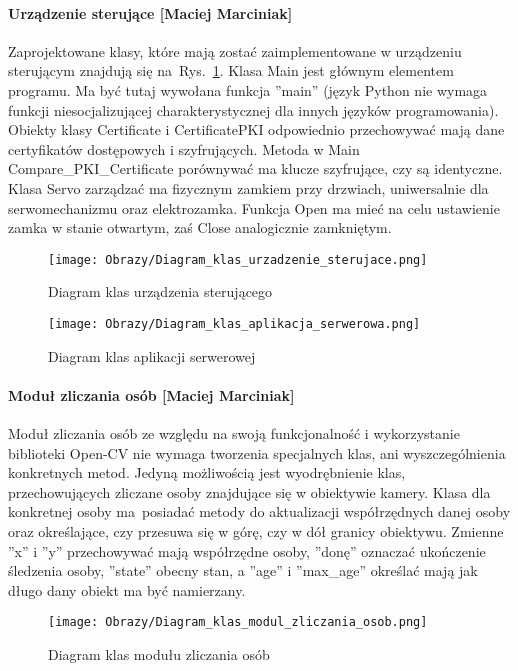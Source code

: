 \documentclass[twoside,10pt]{article}
\begin{document}
\paragraph*{Urządzenie sterujące [Maciej Marciniak]}
Zaprojektowane klasy, które mają zostać zaimplementowane w urządzeniu sterującym znajdują się \linebreak na~Rys.~\ref{diagram:Diagram_klas_urzadzenia_sterujacego}. Klasa Main jest głównym elementem programu. Ma być tutaj wywołana funkcja ''main'' (język Python nie wymaga funkcji niesocjalizującej charakterystycznej dla innych języków programowania). Obiekty klasy Certificate i CertificatePKI odpowiednio przechowywać mają dane certyfikatów dostępowych i szyfrujących. Metoda w Main Compare\_PKI\_Certificate porównywać ma klucze szyfrujące, czy są identyczne. Klasa Servo zarządzać ma fizycznym zamkiem przy drzwiach, uniwersalnie dla serwomechanizmu oraz elektrozamka. Funkcja Open ma mieć na celu ustawienie zamka w stanie otwartym, zaś Close analogicznie zamkniętym. 

\begin{figure}[!h]
\centering
\texttt{[image: Obrazy/Diagram\_klas\_urzadzenie\_sterujace.png]}
\caption{Diagram klas urządzenia sterującego}
\label{diagram:Diagram_klas_urzadzenia_sterujacego}
\end{figure}

\begin{landscape}
\begin{figure}[!h]
\centering
\vspace{2.5cm}
\texttt{[image: Obrazy/Diagram\_klas\_aplikacja\_serwerowa.png]}
\caption{Diagram klas aplikacji serwerowej}
\label{diagram:Diagram_klas_aplikacji_serwerowej}
\end{figure}
\end{landscape}

\paragraph*{Moduł zliczania osób [Maciej Marciniak]}
Moduł zliczania osób ze względu na swoją funkcjonalność i wykorzystanie biblioteki Open-CV nie wymaga tworzenia specjalnych klas, ani wyszczególnienia konkretnych metod. Jedyną możliwością jest wyodrębnienie klas, przechowujących zliczane osoby znajdujące się w obiektywie kamery. Klasa dla konkretnej osoby ma~posiadać metody do aktualizacji współrzędnych danej osoby oraz określające, czy przesuwa się w górę, czy w dół granicy obiektywu. Zmienne ''x'' i ''y'' przechowywać mają współrzędne osoby, ''donę'' oznaczać ukończenie śledzenia osoby, ''state'' obecny stan, a ''age'' i ''max\_age'' określać mają jak długo dany obiekt ma być namierzany.
\begin{figure}[!h]
\centering
\texttt{[image: Obrazy/Diagram\_klas\_modul\_zliczania\_osob.png]}
\caption{Diagram klas modułu zliczania osób}
\label{diagram:Diagram_klas_modul_zliczania_osob}
\end{figure}
\end{document}
